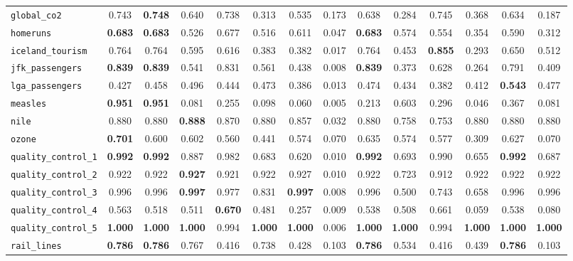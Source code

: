 \begin{tabular}{lccccccccccccc}
\verb+global_co2+ & 0.743 & \textbf{0.748} & 0.640 & 0.738 & 0.313 & 0.535 & 0.173 & 0.638 & 0.284 & 0.745 & 0.368 & 0.634 & 0.187\\
\verb+homeruns+ & \textbf{0.683} & \textbf{0.683} & 0.526 & 0.677 & 0.516 & 0.611 & 0.047 & \textbf{0.683} & 0.574 & 0.554 & 0.354 & 0.590 & 0.312\\
\verb+iceland_tourism+ & 0.764 & 0.764 & 0.595 & 0.616 & 0.383 & 0.382 & 0.017 & 0.764 & 0.453 & \textbf{0.855} & 0.293 & 0.650 & 0.512\\
\verb+jfk_passengers+ & \textbf{0.839} & \textbf{0.839} & 0.541 & 0.831 & 0.561 & 0.438 & 0.008 & \textbf{0.839} & 0.373 & 0.628 & 0.264 & 0.791 & 0.409\\
\verb+lga_passengers+ & 0.427 & 0.458 & 0.496 & 0.444 & 0.473 & 0.386 & 0.013 & 0.474 & 0.434 & 0.382 & 0.412 & \textbf{0.543} & 0.477\\
\verb+measles+ & \textbf{0.951} & \textbf{0.951} & 0.081 & 0.255 & 0.098 & 0.060 & 0.005 & 0.213 & 0.603 & 0.296 & 0.046 & 0.367 & 0.081\\
\verb+nile+ & 0.880 & 0.880 & \textbf{0.888} & 0.870 & 0.880 & 0.857 & 0.032 & 0.880 & 0.758 & 0.753 & 0.880 & 0.880 & 0.880\\
\verb+ozone+ & \textbf{0.701} & 0.600 & 0.602 & 0.560 & 0.441 & 0.574 & 0.070 & 0.635 & 0.574 & 0.577 & 0.309 & 0.627 & 0.070\\
\verb+quality_control_1+ & \textbf{0.992} & \textbf{0.992} & 0.887 & 0.982 & 0.683 & 0.620 & 0.010 & \textbf{0.992} & 0.693 & 0.990 & 0.655 & \textbf{0.992} & 0.687\\
\verb+quality_control_2+ & 0.922 & 0.922 & \textbf{0.927} & 0.921 & 0.922 & 0.927 & 0.010 & 0.922 & 0.723 & 0.912 & 0.922 & 0.922 & 0.922\\
\verb+quality_control_3+ & 0.996 & 0.996 & \textbf{0.997} & 0.977 & 0.831 & \textbf{0.997} & 0.008 & 0.996 & 0.500 & 0.743 & 0.658 & 0.996 & 0.996\\
\verb+quality_control_4+ & 0.563 & 0.518 & 0.511 & \textbf{0.670} & 0.481 & 0.257 & 0.009 & 0.538 & 0.508 & 0.661 & 0.059 & 0.538 & 0.080\\
\verb+quality_control_5+ & \textbf{1.000} & \textbf{1.000} & \textbf{1.000} & 0.994 & \textbf{1.000} & \textbf{1.000} & 0.006 & \textbf{1.000} & \textbf{1.000} & 0.994 & \textbf{1.000} & \textbf{1.000} & \textbf{1.000}\\
\verb+rail_lines+ & \textbf{0.786} & \textbf{0.786} & 0.767 & 0.416 & 0.738 & 0.428 & 0.103 & \textbf{0.786} & 0.534 & 0.416 & 0.439 & \textbf{0.786} & 0.103\\

\end{tabular}
